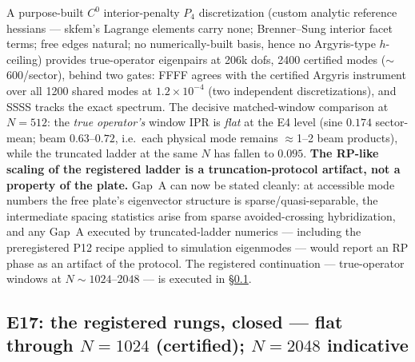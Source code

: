 \documentclass[11pt]{article}
\begin{document}
A purpose-built $C^0$ interior-penalty $P_4$ discretization (custom
analytic reference hessians --- skfem's Lagrange elements carry none;
Brenner--Sung interior facet terms; free edges natural; no
numerically-built basis, hence no Argyris-type $h$-ceiling) provides
true-operator eigenpairs at 206k dofs, 2400 certified modes
($\sim$600/sector), behind two gates: FFFF agrees with the certified
Argyris instrument over all 1200 shared modes at $1.2\times10^{-4}$ (two
independent discretizations), and SSSS tracks the exact spectrum. The
decisive matched-window comparison at $N=512$: the \emph{true operator's}
window IPR is \emph{flat} at the E4 level (sine $0.174$ sector-mean; beam
$0.63$--$0.72$, i.e.\ each physical mode remains $\approx$1--2 beam
products), while the truncated ladder at the same $N$ has fallen to
$0.095$. \textbf{The RP-like scaling of the registered ladder is a
truncation-protocol artifact, not a property of the plate.} Gap~A can now
be stated cleanly: at accessible mode numbers the free plate's eigenvector
structure is sparse/quasi-separable, the intermediate spacing statistics
arise from sparse avoided-crossing hybridization, and any Gap~A executed by
truncated-ladder numerics --- including the preregistered P12 recipe
applied to simulation eigenmodes --- would report an RP phase as an
artifact of the protocol. The registered continuation --- true-operator
windows at $N\sim1024$--$2048$ --- is executed in \S\ref{sec:e17}.

\subsection{E17: the registered rungs, closed --- flat through $N=1024$
(certified); $N=2048$ indicative}
\label{sec:e17}
\end{document}
